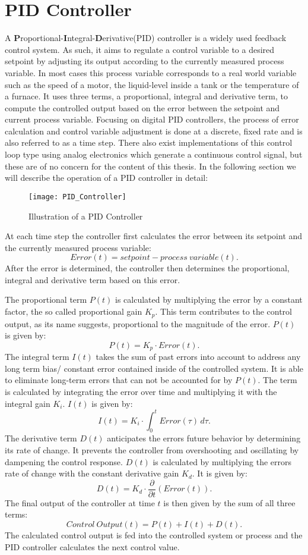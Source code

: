 \section{PID Controller}
A \textbf{P}roportional-\textbf{I}ntegral-\textbf{D}erivative(PID) controller is a widely used feedback control system.
As such, it aims to regulate a control variable to a desired setpoint by adjusting its output according to the currently measured process variable.
In most cases this process variable corresponds to a real world variable such as the speed of a motor, the liquid-level inside a tank or the temperature of a furnace.
It uses three terms, a proportional, integral and derivative term, to compute the controlled output based on the error between the setpoint and current process variable.
Focusing on digital PID controllers, the process of error calculation and control variable adjustment is done at a discrete, fixed rate and is also referred to as a time step.
There also exist implementations of this control loop type using analog electronics which generate a continuous control signal, but these are of no concern for the content of this thesis.
In the following section we will describe the operation of a PID controller in detail:

\begin{figure}[h]
	\centerline{\texttt{[image: PID\_Controller]}}
	\caption{Illustration of a PID Controller}
	\label{figure: PID Controller}
\end{figure}

At each time step the controller first calculates the error between its setpoint and the currently measured process variable: 
\[
	Error(t) = setpoint - process\ variable(t)
.\]
After the error is determined, the controller then determines the proportional, integral and derivative term based on this error.

The proportional term $P(t)$ is calculated by multiplying the error by a constant factor, the so called proportional gain $K_p$.
This term contributes to the control output, as its name suggests, proportional to the magnitude of the error.
$P(t)$ is given by:
\[
	P(t) = K_p \cdot Error(t)
.\]
The integral term $I(t)$ takes the sum of past errors into account to address any long term bias/ constant error contained inside of the controlled system.
It is able to eliminate long-term errors that can not be accounted for by $P(t)$.
The term is calculated by integrating the error over time and multiplying it with the integral gain $K_i$.
$I(t)$ is given by:
\[
	I(t) = K_i \cdot \int_{0}^{t} Error(\tau) \,d\tau
.\]
The derivative term $D(t)$ anticipates the errors future behavior by determining its rate of change.
It prevents the controller from overshooting and oscillating by dampening the control response.
$D(t)$ is calculated by multiplying the errors rate of change with the constant derivative gain $K_d$.
It is given by:
\[
	D(t) = K_d \cdot \frac{\partial}{\partial t}(Error(t))
.\]
The final output of the controller at time $t$ is then given by the sum of all three terms:
\[
	Control\ Output(t) = P(t) + I(t) + D(t)
.\]
The calculated control output is fed into the controlled system or process and the PID controller calculates the next control value.

